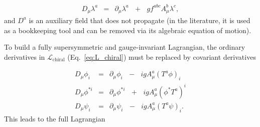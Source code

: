 \documentclass[dissertation.tex]{subfiles}
\begin{document}
\begin{eqnarray}
\label{eq:gaugino_covariant_derivative}
D_{\mu}\lambda^{a} &=& \partial_{\mu}\lambda^{a}\mbox{ }+\mbox{ }gf^{abc}A_{\mu}^{b}\lambda^{c}, 
\end{eqnarray}
%
and $D^{a}$ is an auxiliary field that does not propagate (in the literature, it is used as a bookkeeping tool and can be removed via its algebraic equation of motion).

To build a fully supersymmetric and gauge-invariant Lagrangian, the ordinary derivatives in $\mathcal{L}_{\mathrm{chiral}}$ (Eq.~\ref{eq:L_chiral}) must be replaced by covariant derivatives

\begin{eqnarray}
\label{eq:fermion_sfermion_covariant_derivatives}
D_{\mu}\phi_{i} &=& \partial_{\mu}\phi_{i}\mbox{ }-\mbox{ }igA_{\mu}^{a}(T^{a}\phi)_{i}\\
D_{\mu}\phi^{*i} &=& \partial_{\mu}\phi^{*i}\mbox{ }+\mbox{ }igA_{\mu}^{a}(\phi^{*}T^{a})^{i}\\
D_{\mu}\psi_{i} &=& \partial_{\mu}\psi_{i}\mbox{ }-\mbox{ }igA_{\mu}^{a}(T^{a}\psi)_{i}.
\end{eqnarray}
%
This leads to the full Lagrangian
\end{document}
